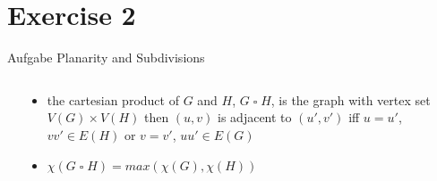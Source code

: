 
\section{Exercise 2}

\setcounter{exercise}{1}

\begin{frame}[allowframebreaks]{Aufgabe \thesection}{\small Planarity and Subdivisions}
  \begin{solution}
  \end{solution}
  \begin{requirementsnoinc}
    \begin{columns}
      \begin{column}{0.5\textwidth}
      \end{column}
      \begin{column}{0.5\textwidth}
        \begin{itemize}
        \item the cartesian product of $G$ and $H$, $G \operatorname{\square} H$, is the graph with vertex set $V(G) \times V(H)$ then $(u,v)$ is adjacent to $(u',v')$ \alert{iff} $u=u'$, $vv' \in E(H)$ or $v=v'$, $uu' \in E(G)$
          \item  $\chi(G \operatorname{\square} H) = max(\chi(G), \chi(H))$
        \end{itemize}
      \end{column}
    \end{columns}
  \end{requirementsnoinc}
  \begin{solution}
  \end{solution}
  \begin{solution}
  \end{solution}

\end{frame}
